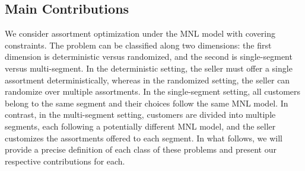\documentclass[msom,non-blindrev]{informs3} %
\theoremstyle{definition}
\begin{document}


\subsection{Main Contributions}

We consider assortment optimization under the MNL model with covering constraints. The problem can be classified along two dimensions: the first dimension is deterministic versus randomized, and the second is single-segment versus multi-segment. In the deterministic setting, the seller must offer a single assortment deterministically, whereas in the randomized setting, the seller can randomize over multiple assortments. In the single-segment setting, all customers belong to the same segment and their choices follow the same MNL model. In contrast, in the multi-segment setting, customers are divided into multiple segments, each following a potentially different MNL model, and the seller customizes the assortments offered to each segment. In what follows, we will provide a precise definition of each class of these problems and present our respective contributions for each.

\vspace{3mm}
\end{document}
